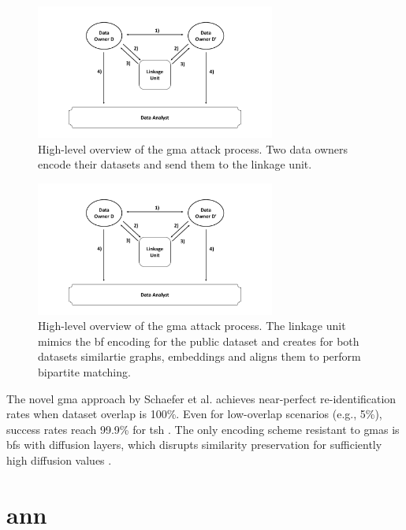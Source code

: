 \begin{figure}[H]
  \centering
  \includegraphics[width=0.7\textwidth, page=10]{img/visualization.pdf}
  \caption{High-level overview of the \ac{gma} attack process.
  Two data owners encode their datasets and send them to the linkage unit.}
  \label{fig:gmaexampleone}
\end{figure}

\begin{figure}[H]
  \centering
  \includegraphics[width=0.7\textwidth, page=11]{img/visualization.pdf}
  \caption{High-level overview of the \ac{gma} attack process.
  The linkage unit mimics the \ac{bf} encoding for the public dataset and creates for both datasets similartie graphs, embeddings and aligns them to perform bipartite matching.}
  \label{fig:gmaexampletwo}
\end{figure}

The novel \ac{gma} approach by Schaefer et al. \cite{schaefer2024} achieves near-perfect re-identification rates when dataset overlap is 100\%.
Even for low-overlap scenarios (e.g., 5\%), success rates reach 99.9\% for \ac{tsh} \cite{schaefer2024}.
The only encoding scheme resistant to \ac{gma}s is \ac{bf}s with diffusion layers, which disrupts similarity preservation for sufficiently high diffusion values \cite{schaefer2024}.


\section{\ac{ann}} \label{sec:nn}

